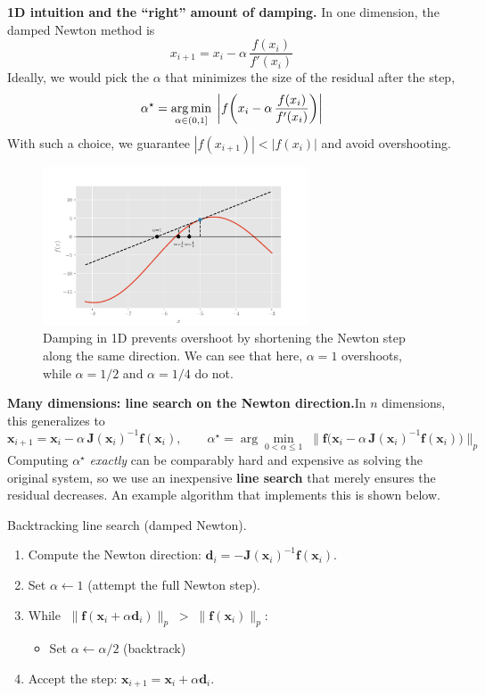 \textbf{1D intuition and the ``right'' amount of damping.} In one dimension, the damped Newton method is
\[
x_{i+1}=x_i-\alpha\,\frac{f(x_i)}{f'(x_i)}
\]
Ideally, we would pick the \(\alpha\) that minimizes the size of the residual after the step,
\[
\alpha^\star = \operatorname*{arg\,min}_{\alpha\in(0,1]}\; \left| f\!\left(x_i-\alpha\,\frac{f(x_i)}{f'(x_i)}\right) \right|
\]
With such a choice, we guarantee \(|f(x_{i+1})|<|f(x_i)|\) and avoid overshooting.

\begin{figure}[h]
    \centering
    \includegraphics[width=0.7\textwidth]{figs/nle/damped_newton_verification.pdf}
    \caption{Damping in 1D prevents overshoot by shortening the Newton step along the same direction. We can see that here, $\alpha=1$ overshoots, while $\alpha=1/2$ and $\alpha=1/4$ do not.}
\end{figure}

\textbf{Many dimensions: line search on the Newton direction.}\quad In \(n\) dimensions, this generalizes to
\[
\mathbf{x}_{i+1}=\mathbf{x}_i-\alpha\,\mathbf{J}(\mathbf{x}_i)^{-1}\mathbf{f}(\mathbf{x}_i),
\qquad
\alpha^\star=\arg\min_{0<\alpha\le 1}\;\bigl\|\mathbf{f}\bigl(\mathbf{x}_i-\alpha\,\mathbf{J}(\mathbf{x}_i)^{-1}\mathbf{f}(\mathbf{x}_i)\bigr)\bigr\|_p
\]
Computing \(\alpha^\star\) \emph{exactly} can be comparably hard and expensive as solving the original system, so we use an inexpensive \textbf{line search} that merely ensures the residual decreases. An example algorithm that implements this is shown below.

\begin{algorithm}[H]
\caption{Backtracking line search (damped Newton).}
\begin{enumerate}
\item Compute the Newton direction: \(\mathbf{d}_i=-\mathbf{J}(\mathbf{x}_i)^{-1}\mathbf{f}(\mathbf{x}_i)\).
\item Set \(\alpha\leftarrow 1\) (attempt the full Newton step).
\item While \(\;\lVert \mathbf{f}(\mathbf{x}_i+\alpha\mathbf{d}_i)\rVert_p \;>\; \lVert \mathbf{f}(\mathbf{x}_i)\rVert_p:\)
\begin{itemize}
  \item Set \(\alpha \leftarrow \alpha/2\) \hfill (backtrack)
\end{itemize}
\item Accept the step: \(\mathbf{x}_{i+1}=\mathbf{x}_i+\alpha\mathbf{d}_i\).
\end{enumerate}
\end{algorithm}

